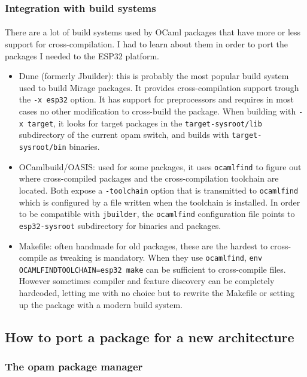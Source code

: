 \documentclass[a4paper]{article}
\begin{document}
\subsubsection{Integration with build systems}
\paragraph{}
There are a lot of build systems used by OCaml packages that have more or less support for cross-compilation. I had to learn about them in order to port the packages I needed to the ESP32 platform.
\begin{itemize}
    \item Dune (formerly Jbuilder): this is probably the most popular build system used to build Mirage packages. It provides cross-compilation support trough the \texttt{-x esp32} option. It has support for preprocessors and requires in most cases no other modification to cross-build the package. When building with \texttt{-x target}, it looks for target packages in the \texttt{target-sysroot/lib} subdirectory of the current opam switch, and builds with \texttt{target-sysroot/bin} binaries. 
    \item OCamlbuild/OASIS: used for some packages, it uses \texttt{ocamlfind} to figure out where cross-compiled packages and the cross-compilation toolchain are located. Both expose a \texttt{-toolchain} option that is transmitted to \texttt{ocamlfind} which is configured by a file written when the toolchain is installed. In order to be compatible with \texttt{jbuilder}, the \texttt{ocamlfind} configuration file points to \texttt{esp32-sysroot} subdirectory for binaries and packages. 
    \item Makefile: often handmade for old packages, these are the hardest to cross-compile as tweaking is mandatory. When they use \texttt{ocamlfind}, \texttt{env OCAMLFINDTOOLCHAIN=esp32 make} can be sufficient to cross-compile files. However sometimes compiler and feature discovery can be completely hardcoded, letting me with no choice but to rewrite the Makefile or setting up the package with a modern build system.
\end{itemize}

\subsection{How to port a package for a new architecture}
\subsubsection{The opam package manager}
\end{document}
